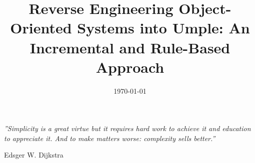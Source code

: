 \documentclass[a4paper, 11pt, oneside]{Thesis}  %
\begin{document}
\frontmatter      %

\title  {Reverse Engineering Object-Oriented Systems into Umple: An Incremental and Rule-Based Approach}
\date       {\today}
\subject    {}
\keywords   {}

\maketitle


\fancyhead{}  %

\rhead{\thepage}  %
\lhead{}  %

\pagestyle{fancy}  %

\pagestyle{empty}  %
\null\vfill
\textit{''Simplicity is a great virtue but it requires hard work to achieve it and education to appreciate it. And to make matters worse: complexity sells better.''}

\begin{flushright}
Edsger W. Dijkstra
\end{flushright}

\vfill\vfill\vfill\vfill\vfill\vfill\null
\clearpage  %
\end{document}
